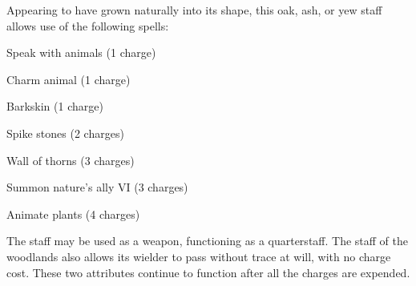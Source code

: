  Appearing to have grown naturally into its shape, this oak, ash, or yew staff allows use of the following spells:
\begin{itemize*}
\item Speak with animals (1 charge)
\item Charm animal (1 charge)
\item Barkskin (1 charge)
\item Spike stones (2 charges)
\item Wall of thorns (3 charges)
\item Summon nature's ally VI (3 charges)
\item Animate plants (4 charges)
\end{itemize*}

The staff may be used as a weapon, functioning as a  quarterstaff. The staff of the woodlands also allows its wielder to pass without trace at will, with no charge cost. These two attributes continue to function after all the charges are expended.

